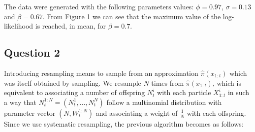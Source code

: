\documentclass[]{article}
\begin{document}
	The data were generated with the following parameters values: $\phi = 0.97$, $\sigma=0.13$ and $\beta=0.67$. From Figure 1 we can see that the maximum value of the log-likelihood is reached, in mean, for $\beta=0.7$.
	
	\subsection*{Question 2}
	Introducing resampling means to sample from an approximation $\hat{\pi}(x_{1:t})$ which was itself obtained by sampling. We resample $N$ times from $\hat{\pi}(x_{1:t})$, which is equivalent to associating a number of offspring $N_t^i$ with each particle $X_{1:t}^i$ in such a way that $N_t^{1:N} = (N_t^1, ..., N_t^N)$ follow a multinomial distribution with parameter vector $(N, W_t^{1:N})$ and associating a weight of $\frac{1}{N}$ with each offspring. Since we use systematic resampling, the previous algorithm becomes as follows:
	
\end{document}

